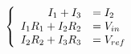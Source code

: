 \documentclass{article}
\begin{document}
\thispagestyle{empty}

$$
\left \{ \begin{array}{r l}
I_1+I_3 & = I_2\\
I_1R_1 + I_2R_2 &= V_{in}\\
I_2R_2 + I_3R_3 &= V_{ref}\\
\end{array} \right.
$$
\end{document}
